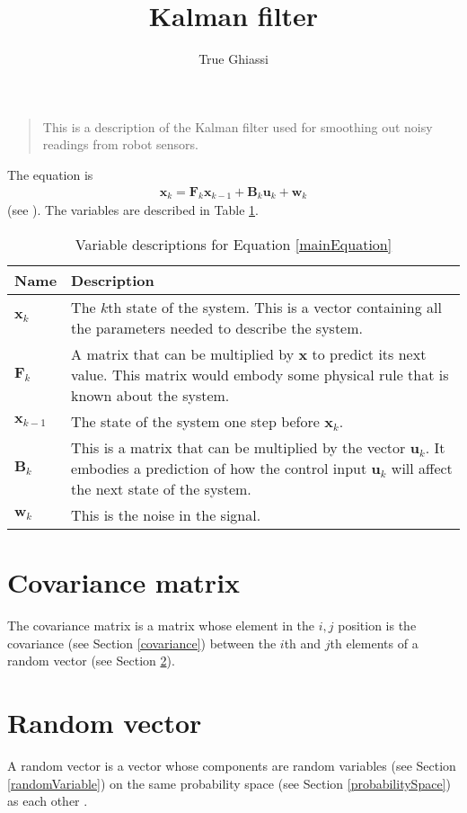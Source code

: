 \documentclass{article}
\title{Kalman filter}
\author{True Ghiassi}
\begin{document}
\maketitle
\begin{quote}
This is a description of the Kalman filter used for smoothing out noisy readings from robot sensors.
\end{quote}
The equation is
\begin{align}
\bm{x}_k = \bm{F}_k\bm{x}_{k-1} + \bm{B}_k\bm{u}_k + \bm{w}_k \label{mainEquation}
\end{align}
(see \cite{wpKalman}).  The variables are described in Table \ref{variableDescriptions}.
\begin{table}
\begin{tabular}{lp{10cm}}\toprule
Name & Description \\ \midrule
$\bm{x}_k$ & The $k$th state of the system.  This is a vector containing all the parameters needed to describe the system. \\
$\bm{F}_k$ & A matrix that can be multiplied by $\bm{x}$ to predict its next value.  This matrix would embody some physical rule that is known about the system.   \\
$\bm{x}_{k-1}$ & The state of the system one step before $\bm{x}_k$. \\
$\bm{B}_k$ & This is a matrix that can be multiplied by the vector $\bm{u}_k$.  It embodies a prediction of how the control input $\bm{u}_k$ will affect the next state of the system. \\
$\bm{w}_k$ & This is the noise in the signal. \\ \bottomrule
\end{tabular}
\caption{Variable descriptions for Equation \ref{mainEquation}}
\label{variableDescriptions}
\end{table}
\section{Covariance matrix}
The covariance matrix is a matrix whose element in the $i,j$ position is the covariance (see Section \ref{covariance}) between the $i$th and $j$th elements of a random vector (see Section \ref{randomVector}).
\section{Random vector} \label{randomVector}
A random vector is a vector whose components are random variables (see Section \ref{randomVariable}) on the same probability space (see Section \ref{probabilitySpace}) as each other \cite{wpRandomVector}.
\end{document}
